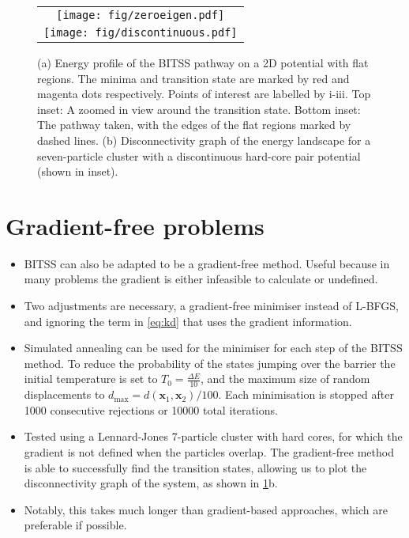 \documentclass[aps,twocolumn]{revtex4}
\begin{document}
\begin{figure}[htb]
  \centering
  \begin{tabular}[b]{c}
    \texttt{[image: fig/zeroeigen.pdf]}\\
    \texttt{[image: fig/discontinuous.pdf]}
  \end{tabular}
  \caption{(a) Energy profile of the BITSS pathway on a 2D potential with flat regions. The minima and transition state are marked by red and magenta dots respectively. Points of interest are labelled by i-iii. Top inset: A zoomed in view around the transition state. Bottom inset: The pathway taken, with the edges of the flat regions marked by dashed lines. (b) Disconnectivity graph of the energy landscape for a seven-particle cluster with a discontinuous hard-core pair potential (shown in inset).}
  \label{fig:flatdiscontinuous}
\end{figure}


\section{Gradient-free problems}
\begin{itemize}
\item
BITSS can also be adapted to be a gradient-free method.
Useful because in many problems the gradient is either infeasible to calculate or undefined.
\item
Two adjustments are necessary, a gradient-free minimiser instead of L-BFGS, and ignoring the term in \cref{eq:kd} that uses the gradient information.
\item
Simulated annealing can be used for the minimiser for each step of the BITSS method.
To reduce the probability of the states jumping over the barrier the initial temperature is set to $T_0 = \frac{\Delta E}{10}$, and the maximum size of random displacements to $d_\text{max} = d(\bm{x}_1, \bm{x}_2) / 100$.
Each minimisation is stopped after 1000 consecutive rejections or 10000 total iterations.
\item
Tested using a Lennard-Jones 7-particle cluster with hard cores, for which the gradient is not defined when the particles overlap.
The gradient-free method is able to successfully find the transition states, allowing us to plot the disconnectivity graph of the system, as shown in \cref{fig:flatdiscontinuous}b.
\item
Notably, this takes much longer than gradient-based approaches, which are preferable if possible.
\end{itemize}
\end{document}
